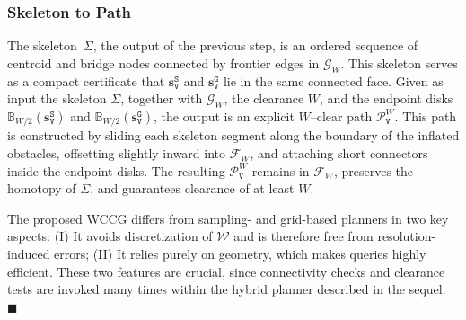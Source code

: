 \subsubsection{Skeleton to Path}
The skeleton~$\Sigma$, the output of the previous step,
is an ordered sequence of centroid and bridge nodes connected by frontier
edges in $\mathcal{G}_W$. This skeleton serves as a compact certificate that
$\mathbf{s}_\texttt{V}^{\texttt{S}}$ and $\mathbf{s}_\texttt{V}^{\texttt{G}}$
lie in the same connected face. Given as input the skeleton $\Sigma$, together
with $\mathcal{G}_W$, the clearance $W$, and the endpoint disks
$\mathbb{B}_{W/2}(\mathbf{s}_\texttt{V}^{\texttt{S}})$ and
$\mathbb{B}_{W/2}(\mathbf{s}_\texttt{V}^{\texttt{G}})$, the output is an explicit
$W$--clear path $\mathcal{P}^W_\texttt{V}$. This path is constructed by sliding
each skeleton segment along the boundary of the inflated obstacles, offsetting
slightly inward into $\mathcal{F}_W$, and attaching short connectors inside the
endpoint disks. The resulting $\mathcal{P}^W_\texttt{V}$ remains in
$\mathcal{F}_W$, preserves the homotopy of $\Sigma$, and guarantees clearance of
at least $W$.


\begin{remark}\label{remark:wccg}
  The proposed WCCG differs from sampling- and grid-based planners in two key aspects:
  (I) It avoids discretization of $\mathcal{W}$ and is therefore free from
  resolution-induced errors;
  (II) It relies purely on geometry, which makes
queries highly efficient. These two features are crucial, since connectivity
checks and clearance tests are invoked many times within the hybrid
planner described in the sequel. \hfill$\blacksquare$
\end{remark}





